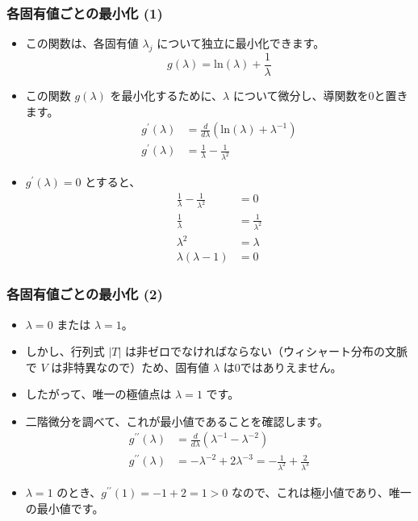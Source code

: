 \documentclass[aspectratio=169]{beamer}
\begin{document}
\begin{frame}
\frametitle{各固有値ごとの最小化 (1)}
\begin{itemize}
    \item この関数は、各固有値 $\lambda_j$ について独立に最小化できます。
    \[ g(\lambda)=\text{ln}(\lambda)+\frac{1}{\lambda} \]
    \item この関数 $g(\lambda)$ を最小化するために、$\lambda$ について微分し、導関数を0と置きます。
    \begin{align*}
        g^{\prime}(\lambda)&=\frac{d}{d\lambda}(\text{ln}(\lambda)+\lambda^{-1}) \\
        g^{\prime}(\lambda)&=\frac{1}{\lambda}-\frac{1}{\lambda^2}
    \end{align*}
    \item $g^{\prime}(\lambda)=0$ とすると、
    \begin{align*}
        \frac{1}{\lambda}-\frac{1}{\lambda^2}&=0 \\
        \frac{1}{\lambda}&=\frac{1}{\lambda^2} \\
        \lambda^2&=\lambda \\
        \lambda(\lambda-1)&=0
    \end{align*}
\end{itemize}
\end{frame}

\begin{frame}
\frametitle{各固有値ごとの最小化 (2)}
\begin{itemize}
    \item $\lambda=0$ または $\lambda=1$。
    \item しかし、行列式 $|T|$ は非ゼロでなければならない（ウィシャート分布の文脈で $V$ は非特異なので）ため、固有値 $\lambda$ は0ではありえません。
    \item したがって、唯一の極値点は $\lambda=1$ です。
    \item 二階微分を調べて、これが最小値であることを確認します。
    \begin{align*}
        g^{\prime\prime}(\lambda)&=\frac{d}{d\lambda}(\lambda^{-1}-\lambda^{-2}) \\
        g^{\prime\prime}(\lambda)&=-\lambda^{-2}+2\lambda^{-3}=-\frac{1}{\lambda^2}+\frac{2}{\lambda^3}
    \end{align*}
    \item $\lambda=1$ のとき、$g^{\prime\prime}(1)=-1+2=1>0$ なので、これは極小値であり、唯一の最小値です。
\end{itemize}
\end{frame}
\end{document}
